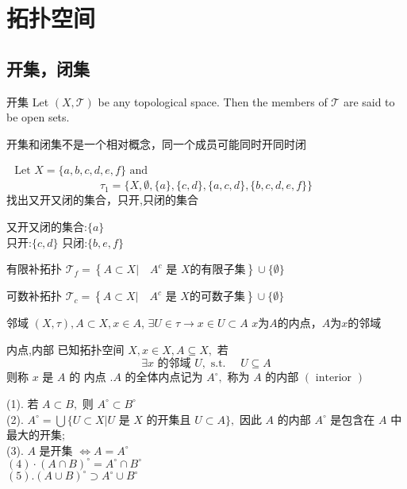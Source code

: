 \chapter{拓扑空间}
\section{开集，闭集}
\begin{definition}{开集}
\noindent Let $(X, \mathcal{T})$ be any topological space. Then the members of $\mathcal{T}$ are said to be open sets.
\end{definition}
\begin{remark}
	开集和闭集不是一个相对概念，同一个成员可能同时开同时闭
\end{remark}
\begin{example}
	$\begin{array}{lll}  \text { Let } X=\{a, b, c, d, e, f\} \text { and }\end{array}$
	\[
	\tau_{1}=\{X, \emptyset,\{a\},\{c, d\},\{a, c, d\},\{b, c, d, e, f\}\}
	\]
	找出又开又闭的集合，只开,只闭的集合
\end{example}
\begin{remark}
	又开又闭的集合:$\{a\}$ \\
	只开:$\{c, d\}$
	只闭:$\{b,e,f\}$
\end{remark}
\begin{definition}{有限补拓扑}
	$\mathcal{T}_{f}=\left\{A \subset X | \quad A^{c} \text { 是 } X \text {的有限子集}\right\} \cup\{\emptyset\}$
\end{definition}
\begin{definition}{可数补拓扑}
	$\mathcal{T}_{c}=\left\{A \subset X | \quad A^{c} \text { 是 } X \text {的可数子集}\right\} \cup\{\emptyset\}$
\end{definition}
\begin{definition}{邻域}
\noindent $(X,\tau) ,A\subset X,x \in A$,
$\exists U \in \tau\rightarrow x \in U \subset A$
$x$为$A$的内点，$A$为$x$的邻域
\end{definition}
\begin{definition}{内点,内部}
\noindent	 已知拓扑空间 $X, x \in X, A \subseteq X,$ 若
	\[
	\exists x \text { 的邻域 } U, \text { s.t. } \quad U \subseteq A
	\]
	则称 $x$ 是 $A$ 的 内点 $. A$ 的全体内点记为 $A^{\circ},$ 称为 $A$ 的内部 $(\text { interior })$
\end{definition}
\begin{property}
(1). 若 $A \subset B,$ 则 $A^{\circ} \subset B^{\circ}$ \\
(2). $A^{\circ}=\bigcup\{U \subset X | U \text { 是 } X \text { 的开集且 } U \subset A\},$ 因此 $A$ 的内部 $A^{\circ}$ 是包含在
$A$ 中最大的开集;\\
(3). $A$ 是开集 $\Longleftrightarrow A=A^{\circ}$\\
$(4) \cdot(A \cap B)^{\circ}=A^{\circ} \cap B^{\circ}$ \\
$(5) .(A \cup B)^{\circ} \supset A^{\circ} \cup B^{\circ}$ \\
\end{property}
